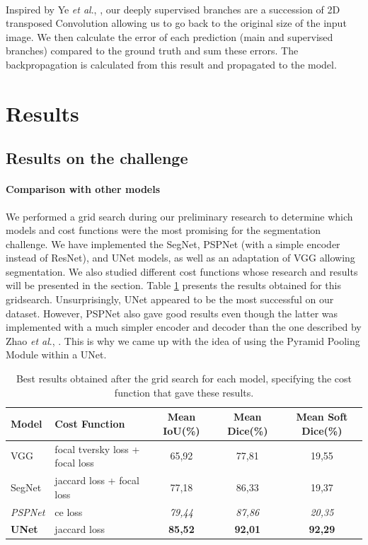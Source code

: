 \documentclass[english]{article}
\newcommand{\etal}{\textit{et al}., }
\begin{document}
\paragraph{}Inspired by Ye \etal\cite{multidepth_fusion}, our deeply supervised branches are a succession of 2D transposed Convolution allowing us to go back to the original size of the input image. We then calculate the error of each prediction (main and supervised branches) compared to the ground truth and sum these errors. The backpropagation is calculated from this result and propagated to the model.





\section{Results}

\subsection{Results on the challenge}
\paragraph{Comparison with other models}
\label{comp:models}
We performed a grid search during our preliminary research to determine which models and cost functions were the most promising for the segmentation challenge. We have implemented the SegNet, PSPNet (with a simple encoder instead of ResNet), and UNet models, as well as an adaptation of VGG allowing segmentation. We also studied different cost functions whose research and results will be presented in the  section. Table \ref{tab:baseline} presents the results obtained for this gridsearch. Unsurprisingly, UNet appeared to be the most successful on our dataset. However, PSPNet also gave good results even though the latter was implemented with a much simpler encoder and decoder than the one described by Zhao \etal\cite{PSPNet}. This is why we came up with the idea of using the Pyramid Pooling Module within a UNet.

\begin{table}[h]
    \centering
    \footnotesize
    \begin{tabular}{l l c c c}
        \hline
        Model & Cost Function & Mean IoU(\%) & Mean Dice(\%) & Mean Soft Dice(\%)\\
        \hline
        \hline
        VGG & focal tversky loss + focal loss & 65,92 & 77,81 & 19,55\\
        SegNet & jaccard loss + focal loss & 77,18 & 86,33 & 19,37\\
        \textit{PSPNet} & ce loss & \textit{79,44} & \textit{87,86} & \textit{20,35}\\
        \textbf{UNet} & jaccard loss & \textbf{85,52} & \textbf{92,01} & \textbf{92,29}\\
        \hline
    \end{tabular}
    \caption{Best results obtained after the grid search for each model, specifying the cost function that gave these results.}
    \label{tab:baseline}
\end{table}
\end{document}
